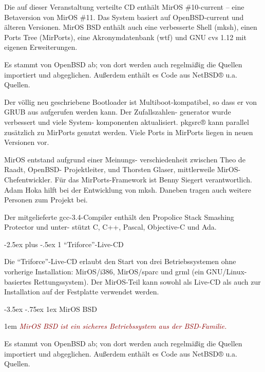 \documentclass[
a4paper,landscape,11pt,%
notumble%
]{leaflet}
\makeatletter
\newcommand{\sectbox}[1]{%
 \noindent\protect\colorbox{yellow}{%
 \@tempdima=\hsize
 \advance\@tempdima by-2\fboxsep
 \advance\@tempdima by-2\fboxrule
 \protect\parbox{\@tempdima}{%
 \medskip
 \raggedright %
 #1 \medskip
}}}
\renewcommand\section{\@startsection{section}{1}{0.9em}%
  {-3.5ex \@plus -.75ex}%
  {1ex} %
  {\normalfont\Large\itshape\sectbox}}
\newcommand\mysubsection{\@startsection{subsection}{2}{1em}%
  {-2.5ex plus -.5ex}%
  {1\p@} %
  {\normalfont\Large\itshape\color{darkred}}}
\renewcommand\subsection[1]{\mysubsection{#1}{\color{LIGHTGRAY}{\vspace{2pt}\hrule height 1pt}\vspace{3pt}}}
\makeatother
\begin{document}

Die auf dieser Veranstaltung verteilte CD enthält MirOS \#10-current -- eine Betaversion von MirOS \#11. Das System basiert auf OpenBSD-current und älteren Versionen. MirOS BSD enthält auch eine verbesserte Shell (mksh), einen Ports Tree (MirPorts), eine Akronymdatenbank (wtf) und GNU cvs 1.12 mit eigenen Erweiterungen.

Es stammt von OpenBSD ab; von dort werden auch regelmäßig die Quellen importiert und abgeglichen. Außerdem enthält es Code aus NetBSD® u.a. Quellen.

Der völlig neu geschriebene Bootloader ist Multiboot-kompatibel, so dass er von GRUB aus aufgerufen werden kann. Der Zufallszahlen- generator wurde verbessert und viele System- komponenten aktualisiert. pkgsrc® kann parallel zusätzlich zu MirPorts genutzt werden. Viele Ports in MirPorts liegen in neuen Versionen vor.

MirOS entstand aufgrund einer Meinungs- verschiedenheit zwischen Theo de Raadt, OpenBSD- Projektleiter, und Thorsten Glaser, mittlerweile MirOS- Chefentwickler. Für das MirPorts-Framework ist Benny Siegert verantwortlich. Adam Hoka hilft bei der Entwicklung von mksh. Daneben tragen auch weitere Personen zum Projekt bei.

Der mitgelieferte gcc-3.4-Compiler enthält den Propolice Stack Smashing Protector und unter- stützt C, C++, Pascal, Objective-C und Ada.

\subsection{"`Triforce"'-Live-CD}

Die "`Triforce"'-Live-CD erlaubt den Start von drei Betriebssystemen ohne vorherige Installation: MirOS/i386, MirOS/sparc und grml (ein GNU/Linux-basiertes Rettungssystem). Der MirOS-Teil kann sowohl als Live-CD als auch zur Installation auf der Festplatte verwendet werden.

\newpage

\section{MirOS BSD}

{\hangindent 1em%
\textcolor{darkred}{\itshape\Large MirOS BSD ist ein sicheres Betriebssystem aus der BSD-Familie.}\par\medskip}

Es stammt von OpenBSD ab; von dort werden auch regelmäßig die Quellen importiert und abgeglichen. Außerdem enthält es Code aus NetBSD® u.a. Quellen.
\end{document}
